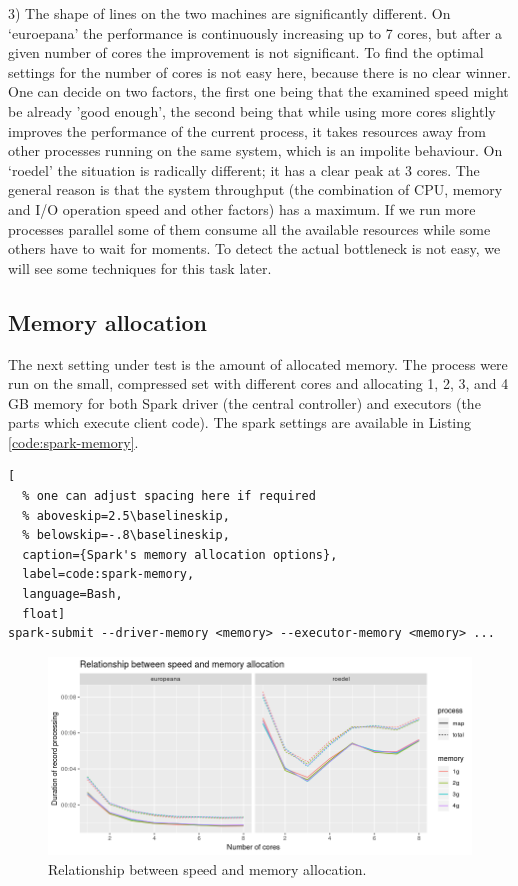 3) The shape of lines on the two machines are significantly different. On `euroepana' the performance is continuously increasing up to 7 cores, but after a given number of cores the improvement is not significant. To find the optimal settings for the number of cores is not easy here, because there is no clear winner. One can decide on two factors, the first one being that the examined speed might be already 'good enough', the second being that while using more cores slightly improves the performance of the current process, it takes resources away from other processes running on the same system, which is an impolite behaviour. On `roedel' the situation is radically different; it has a clear peak at 3 cores. The general reason is that the system throughput (the combination of CPU, memory and I/O operation speed and other factors) has a maximum. If we run more processes parallel some of them consume all the available resources while some others have to wait for moments. To detect the actual bottleneck is not easy, we will see some techniques for this task later.

\subsection{Memory allocation}

The next setting under test is the amount of allocated memory. The process were run on the small, compressed set with different cores and allocating 1, 2, 3, and 4 GB memory for both Spark driver (the central controller) and executors (the parts which execute client code). The spark settings are available in Listing \ref{code:spark-memory}.

\begin{lstlisting}[
  % one can adjust spacing here if required
  % aboveskip=2.5\baselineskip,
  % belowskip=-.8\baselineskip,
  caption={Spark's memory allocation options},
  label=code:spark-memory,
  language=Bash,
  float]
spark-submit --driver-memory <memory> --executor-memory <memory> ...
\end{lstlisting}

\begin{figure}
\includegraphics[width=\textwidth]{images/chapter06/memory-allocation-details.png}
\caption{Relationship between speed and memory allocation.}
\label{memory-allocation-details}
\end{figure}

